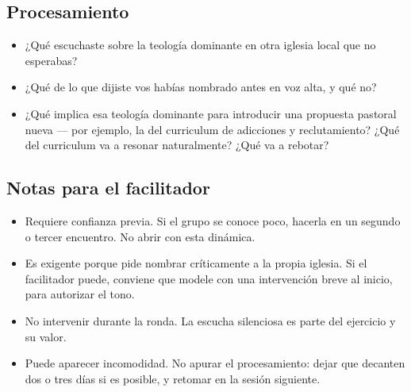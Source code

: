 \documentclass[11pt, a4paper]{article}
\begin{document}
\begin{actividad}
\subsection*{Procesamiento}
\begin{itemize}
  \item ¿Qué escuchaste sobre la teología dominante en otra iglesia local que no esperabas?
  \item ¿Qué de lo que dijiste vos habías nombrado antes en voz alta, y qué no?
  \item ¿Qué implica esa teología dominante para introducir una propuesta pastoral nueva --- por ejemplo, la del curriculum de adicciones y reclutamiento? ¿Qué del curriculum va a resonar naturalmente? ¿Qué va a rebotar?
\end{itemize}

\subsection*{Notas para el facilitador}
\begin{itemize}
  \item Requiere confianza previa. Si el grupo se conoce poco, hacerla en un segundo o tercer encuentro. No abrir con esta dinámica.
  \item Es exigente porque pide nombrar críticamente a la propia iglesia. Si el facilitador puede, conviene que modele con una intervención breve al inicio, para autorizar el tono.
  \item No intervenir durante la ronda. La escucha silenciosa es parte del ejercicio y su valor.
  \item Puede aparecer incomodidad. No apurar el procesamiento: dejar que decanten dos o tres días si es posible, y retomar en la sesión siguiente.
\end{itemize}

\end{actividad}

\newpage
\end{document}
